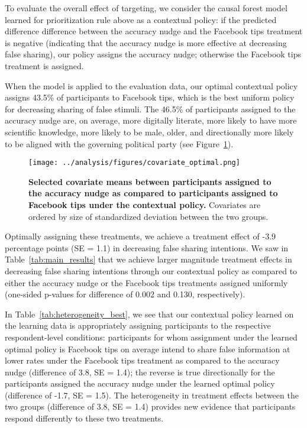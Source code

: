 \documentclass[letterpaper, 12pt, parskip=full,DIV=10]{scrartcl}
\begin{document}
To evaluate the overall effect of targeting, we consider the causal forest model learned for prioritization rule above as a contextual policy: if the predicted difference difference between the accuracy nudge and the Facebook tips treatment is negative (indicating that the accuracy nudge is more effective at decreasing false sharing), our policy assigns the accuracy nudge; otherwise the Facebook tips treatment is assigned.  

When the model is applied to the evaluation data, our optimal contextual policy assigns 43.5\% of participants to Facebook tips, which is the best uniform policy for decreasing sharing of false stimuli. The 46.5\% of participants assigned to the accuracy nudge are, on average, more digitally literate, more likely to have more scientific knowledge,
more likely to be male, older, and directionally more likely to be aligned with the governing political party (see Figure~\ref{fig:heterogeneity_covariates}).

\begin{figure}[H] %
   \centering
   \texttt{[image: ../analysis/figures/covariate\_optimal.png]} 
   \caption{\textbf{Selected covariate means between participants assigned to the accuracy nudge as compared to participants assigned to Facebook tips under the contextual policy.} Covariates are ordered by size of standardized deviation between the two groups. }
   \label{fig:heterogeneity_covariates}
\end{figure}

Optimally assigning these treatments, we achieve a treatment effect of -3.9 percentage points (SE = 1.1) in decreasing false sharing intentions.  We saw in Table~\ref{tab:main_results} that we achieve larger magnitude treatment effects in decreasing false sharing intentions through our contextual policy as compared to either the accuracy nudge or the Facebook tips treatments assigned uniformly (one-sided p-values for difference of 0.002 and 0.130, respectively).  

In Table~\ref{tab:heterogeneity_best}, we see that our contextual policy learned on the learning data is appropriately assigning participants to the respective respondent-level conditions: participants for whom assignment under the learned optimal policy is Facebook tips on average intend to share false information at lower rates under the Facebook tips treatment as compared to the accuracy nudge (difference of 3.8, SE = 1.4); the reverse is true directionally for the participants assigned the accuracy nudge under the learned optimal policy (difference of -1.7, SE = 1.5).  The heterogeneity in treatment effects between the two groups (difference of 3.8, SE = 1.4) provides new evidence that participants respond differently to these two treatments. 
\end{document}
